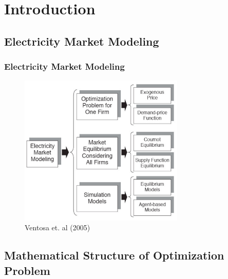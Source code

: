 \section{Introduction}

\subsection{Electricity Market Modeling}

\begin{frame}					
\frametitle{Electricity Market Modeling}

\begin{figure}[h]
\centering
\includegraphics[width=0.7\textwidth]{introduction/ventosa1.pdf}
    \caption{Ventosa et. al (2005)}
    \label{fig:ventosa1}            
\end{figure}
\end{frame}

\subsection{Mathematical Structure of Optimization Problem}


